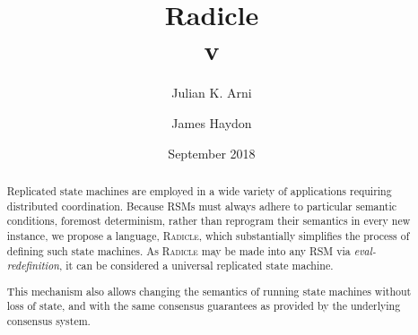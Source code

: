 \documentclass[a4paper, 9pt, draft]{amsart}
\title[Radicle]{Radicle \\ {\tiny v\Small1.0}}
\author{\Small Julian K. Arni}
\author{\Small James Haydon}
\date{September 2018}
\newcommand{\rads}{\textsc{\footnotesize{Radicle}}}
\begin{document}
\begin{abstract}
    Replicated state machines are employed in a wide variety of applications
    requiring distributed coordination. Because RSMs must always adhere to
    particular semantic conditions, foremost determinism, rather than reprogram
    their semantics in every new instance, we propose a language, \rads{}, which
    substantially simplifies the process of defining such state machines. As
    \rads{} may be made into any RSM via \emph{eval-redefinition}, it can be
    considered a universal replicated state machine.

    This mechanism also allows changing the semantics of running state machines
    without loss of state, and with the same consensus guarantees as provided
    by the underlying consensus system.
\end{abstract}
\maketitle

\setlength{\columnsep}{20pt}
\begin{multicols}{2}







\end{multicols}

\appendix


\end{document}
